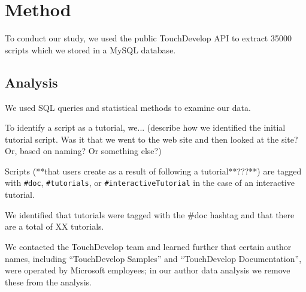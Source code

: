 \section{Method}

To conduct our study, we used the public TouchDevelop API to extract 35000 scripts which we stored in a MySQL database.

\subsection{Analysis}

We used SQL queries and statistical methods to examine our data. 

 To identify a script as a tutorial, we... (describe how we identified the initial tutorial script. Was it that we went to the web site and then looked at the site? Or, based on naming? Or something else?)

 Scripts (**that users create as a result of following a tutorial**???**) are tagged with \texttt{\#doc}, \texttt{\#tutorials}, or \texttt{\#interactiveTutorial} in the case of an interactive tutorial.


We identified that tutorials were tagged with the \#doc hashtag and that there are a total of XX tutorials.

We contacted the TouchDevelop team and learned further that certain author names, including ``TouchDevelop Samples'' and ``TouchDevelop Documentation'', were operated by Microsoft employees; in our author data analysis we remove these from the analysis. 

